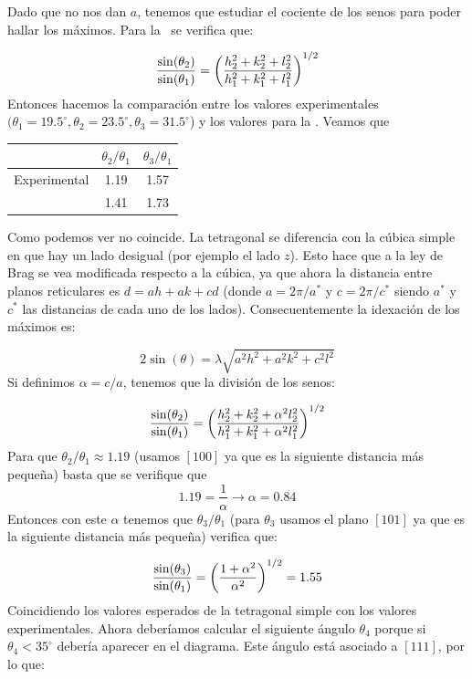 \begin{solucion}
	Dado que no nos dan $a$, tenemos que estudiar el cociente de los senos para poder hallar los máximos. Para la \sc \ se verifica que:
	
	\begin{equation*}
		\frac{\sin(\theta_2)}{\sin (\theta_1)} = \left( \frac{h_2^2 + k_2^2 + l_2^2}{h_1^2 + k_1^2 + l_1^2} \right)^{1/2}
	\end{equation*}
	Entonces hacemos la comparación entre los valores experimentales $(\theta_1=19.5^\circ,\theta_2=23.5^\circ,\theta_3=31.5^\circ$) y los valores para la \sc. Veamos que 
	\begin{center}
		\begin{tabular}{c|c|c}
			& $\theta_2/\theta_1$ & $\theta_3/\theta_1$ \\ \hline
			Experimental &  1.19 & 1.57  \\ 
			\sc  & 1.41 & 1.73
		\end{tabular}
	\end{center}
	Como podemos ver no coincide. La tetragonal se diferencia con la cúbica simple en que hay un lado desigual (por ejemplo el lado $z$). Esto hace que a la ley de Brag se vea modificada respecto a la cúbica, ya que ahora la distancia entre planos reticulares es $d=ah+ak+cd$ (donde $a=2\pi/a^*$ y $c=2\pi/c^*$ siendo $a^*$ y $c^*$ las distancias de cada uno de los lados). Consecuentemente la idexación de los máximos es:
	
	\begin{equation*}
		2 \sin (\theta) = \lambda \sqrt{a^2 h^2 + a^2 k^2 + c^2 l^2}
	\end{equation*}
	Si definimos $\alpha=c/a$, tenemos que la división de los senos: 
	
	\begin{equation*}
		\frac{\sin(\theta_2)}{\sin (\theta_1)} = \left( \frac{h_2^2 + k_2^2 + \alpha^2 l_2^2}{h_1^2 + k_1^2 + \alpha^2 l_1^2} \right)^{1/2}
	\end{equation*} 
	Para que $\theta_2/\theta_1\approx 1.19$ (usamos $[100]$ ya que es la siguiente distancia más pequeña) basta que se verifique que 
	\begin{equation*}
		1.19 = \frac{1}{\alpha} \rightarrow \alpha = 0.84
	\end{equation*}
	Entonces con este $\alpha$ tenemos que $\theta_3/\theta_1$ (para $\theta_3 $ usamos el plano $[101]$ ya que es la siguiente distancia más pequeña) verifica que:
	
	\begin{equation*}
		\frac{\sin(\theta_3)}{\sin (\theta_1)} = \left( \frac{1+\alpha^2}{\alpha^2} \right)^{1/2} = 1.55  		
	\end{equation*}
	Coincidiendo los valores esperados de la tetragonal simple con los valores experimentales. Ahora deberíamos calcular el siguiente ángulo $\theta_4$ porque si $\theta_4 < 35^\circ$ debería aparecer en el diagrama. Este ángulo está asociado a $[111]$, por lo que:
	

\end{solucion}
